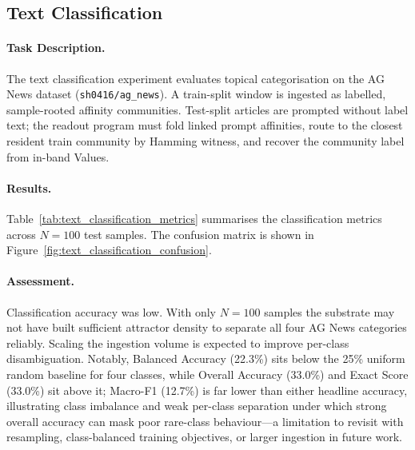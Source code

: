 \subsection{Text Classification}
\label{sec:text_classification}

\paragraph{Task Description.}
The text classification experiment evaluates topical categorisation on
the AG News dataset (\texttt{sh0416/ag\_news}).  A train-split window is
ingested as labelled, sample-rooted affinity communities.  Test-split articles
are prompted without label text; the readout program must fold linked prompt
affinities, route to the closest resident train community by Hamming witness,
and recover the community label from in-band Values.

\paragraph{Results.}
Table~\ref{tab:text_classification_metrics} summarises the classification
metrics across $N = 100$ test samples.
The confusion matrix is shown in Figure~\ref{fig:text_classification_confusion}.

\paragraph{Assessment.}
Classification accuracy was low.  With only $N = 100$ samples the
substrate may not have built sufficient attractor density to separate all
four AG News categories reliably.  Scaling the ingestion volume is expected
to improve per-class disambiguation.
  Notably, Balanced Accuracy (22.3\%) sits below the 25\% uniform random
baseline for four classes, while Overall Accuracy (33.0\%) and Exact Score
(33.0\%) sit above it; Macro-F1 (12.7\%) is far lower than either headline
accuracy, illustrating class imbalance and weak per-class separation under
which strong overall accuracy can mask poor rare-class behaviour---a
limitation to revisit with resampling, class-balanced training objectives, or
larger ingestion in future work.

